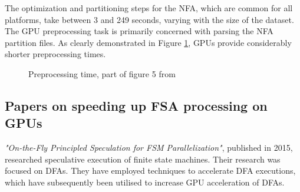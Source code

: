 \documentclass[10pt,onecolumn,twoside,english,a4paper]{article}
\begin{document}
The optimization and partitioning steps for the NFA, which are common for all platforms, take between 3 and 249 seconds, varying with the size of the dataset. The GPU preprocessing task is primarily concerned with parsing the NFA partition files. As clearly demonstrated in Figure \ref{preprocessing:DemystifyingFSA}, GPUs provide considerably shorter preprocessing times.
\begin{figure}[h!]
  \centering
  \caption{Preprocessing time, part of figure 5 from \cite{Nourian:DemystifyingFSA}}
  \label{preprocessing:DemystifyingFSA}
\end{figure}
\subsection{Papers on speeding up FSA processing on GPUs} \label{speeding up FSA processing on GPUs}
\textit{"On-the-Fly Principled Speculation for FSM Parallelization"}\cite{zhao2015fly}, published in 2015, researched speculative execution of finite state machines. Their research was focused on DFAs. They have employed techniques to accelerate DFA executions, which have subsequently been utilised to increase GPU acceleration of DFAs.
\end{document}
